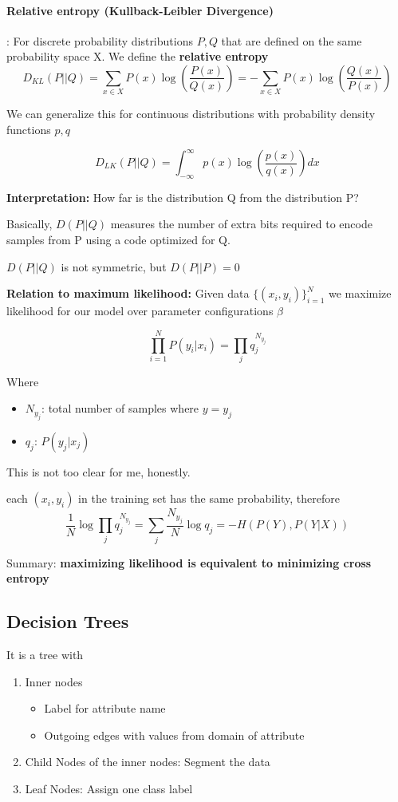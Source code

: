 \documentclass{article}
\begin{document}
\paragraph{Relative entropy (Kullback-Leibler Divergence)}: For discrete probability distributions $P,Q$ that are defined on the same probability space X. We define the \textbf{relative entropy}
\[D_{KL}(P||Q) = \sum_{x\in X } P(x)\log \left(\frac{P(x)}{Q(x)}\right) = - \sum_{x\in X } P(x)\log\left(\frac{Q(x)}{P(x)}\right)\]

We can generalize this for continuous distributions with probability density functions $p,q$

\[D_{LK}(P||Q) = \int_{-\infty}^{\infty}p(x) \log\left(\frac{p(x)}{q(x)}\right)dx\]

\textbf{Interpretation: } How far is the distribution Q from the distribution P?

Basically, $D(P||Q)$ measures the number of extra bits required to encode samples from P using a code optimized for Q.

$D(P||Q)$ is not symmetric, but $D(P||P) = 0$

\textbf{Relation to maximum likelihood: } Given data $\{(x_i,y_i)\}_{i=1}^N$ we maximize likelihood for our model over parameter configurations $\beta$

\[\prod_{i=1}^NP(y_i | x_i) = \prod_{j}q_j^{N_{y_j}}\]

Where 
\begin{itemize}
  \item $N_{y_j}$: total number of samples where $y = y_j$
  \item $q_j$: $P(y_j | x_j)$
\end{itemize}
This is not too clear for me, honestly.

each $(x_i,y_i)$ in the training set has the same probability, therefore
\[\frac{1}{N}\log\prod_jq_j^{N_{y_j}} = \sum_j \frac{N_{y_j}}{N}\log q_j = -H(P(Y),P(Y|X))\]

Summary: \textbf{maximizing likelihood is equivalent to minimizing cross entropy}

\subsection{Decision Trees}
It is a tree with
\begin{enumerate}
  \item Inner nodes
  \begin{itemize}
    \item Label for attribute name
    \item Outgoing edges with values from domain of attribute
  \end{itemize}
  \item Child Nodes of the inner nodes: Segment the data
  \item Leaf Nodes: Assign one class label
\end{enumerate}
\end{document}
